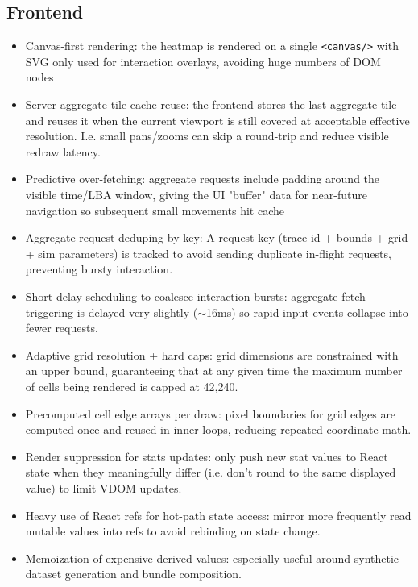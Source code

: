 \documentclass[11pt]{article}
\begin{document}
\subsection{Frontend}
\begin{itemize}
    \item Canvas-first rendering: the heatmap is rendered on a single \texttt{<canvas/>} with SVG only used for interaction overlays, avoiding huge numbers of DOM nodes
    \item Server aggregate tile cache reuse: the frontend stores the last aggregate tile and reuses it when the current viewport is still covered at acceptable effective resolution.  I.e. small pans/zooms can skip a round-trip and reduce visible redraw latency.
    \item Predictive over-fetching: aggregate requests include padding around the visible time/LBA window, giving the UI "buffer" data for near-future navigation so subsequent small movements hit cache
    \item Aggregate request deduping by key: A request key (trace id + bounds + grid + sim parameters) is tracked to avoid sending duplicate in-flight requests, preventing bursty interaction.
    \item Short-delay scheduling to coalesce interaction bursts: aggregate fetch triggering is delayed very slightly ($\sim$16ms) so rapid input events collapse into fewer requests.
    \item Adaptive grid resolution + hard caps: grid dimensions are constrained with an upper bound, guaranteeing that at any given time the maximum number of cells being rendered is capped at 42,240.
    \item Precomputed cell edge arrays per draw: pixel boundaries for grid edges are computed once and reused in inner loops, reducing repeated coordinate math.
    \item Render suppression for stats updates: only push new stat values to React state when they meaningfully differ (i.e. don't round to the same displayed value) to limit VDOM updates.
    \item Heavy use of React refs for hot-path state access: mirror more frequently read mutable values into refs to avoid rebinding on state change.
    \item Memoization of expensive derived values: especially useful around synthetic dataset generation and bundle composition.
\end{itemize}
\end{document}
